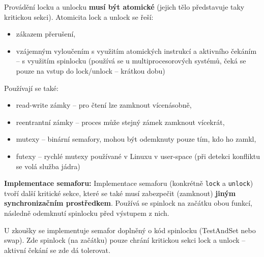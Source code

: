 \documentclass[a4paper, 11pt]{article}
\newcommand{\tcmd}[1]{\texttt{#1}}
\begin{document}
Provádění locku a unlocku \textbf{musí být atomické} (jejich tělo představuje taky kritickou sekci). Atomicita lock a unlock se řeší:
\begin{itemize}
    \item zákazem přerušení,
    \item vzájemným vyloučením s využitím atomických instrukcí a aktivního čekáním -- s využitím spinlocku (používá se u multiprocesorových systémů, čeká se pouze na vstup do lock/unlock -- krátkou dobu)
\end{itemize}
 
Používají se také:
\begin{itemize}
    \item read-write zámky -- pro čtení lze zamknout vícenásobně,
    \item reentrantní zámky -- proces může stejný zámek zamknout vícekrát,
    \item mutexy -- binární semafory, mohou být odemknuty pouze tím, kdo ho zamkl,
    \item futexy -- rychlé mutexy používané v Linuxu v user-space (při detekci konfliktu se volá služba jádra)
\end{itemize}
 
\textbf{Implementace semaforu:}
Implementace semaforu (konkrétně \tcmd{lock} a \tcmd{unlock}) tvoří další kritické sekce, které se také musí zabezpečit (zamknout) \textbf{jiným synchronizačním prostředkem}. Používá se spinlock na začátku obou funkcí, následně odemknutí spinlocku před výstupem z nich.
 
U zkoušky se implementuje semafor doplněný o kód spinlocku (TestAndSet nebo swap). Zde spinlock (na začátku) pouze chrání kritickou sekci lock a unlock -- aktivní čekání se zde dá tolerovat.
\end{document}
